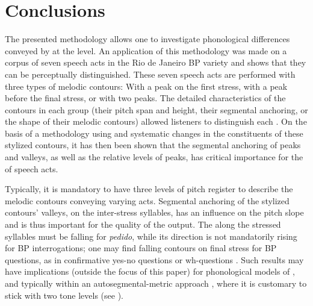 \documentclass[output=paper]{LSP/langsci}
\begin{document}
\section{Conclusions}
\label{conclusions}
The presented methodology allows one to investigate phonological differences conveyed by  at the  level. 
An application of this methodology was made on a corpus of seven  speech acts in the Rio de Janeiro BP variety and shows that they can be perceptually distinguished. 
These seven speech acts are performed with three types of melodic contours: With a peak on the first stress, with a peak before the final stress, or with two peaks. 
The detailed characteristics of the contours in each group (their pitch span and height, their segmental anchoring, or the shape of their melodic contours) allowed listeners to distinguish each . 
On the basis of a methodology using  and systematic changes in the constituents of these stylized contours, it has then been shown that the segmental anchoring of peaks and valleys, as well as the relative levels of peaks, has critical importance for the  of speech acts.
\largerpage[-1]

Typically, it is mandatory to have three levels of pitch register to describe the melodic contours conveying varying  acts. 
Segmental anchoring of the stylized contours' valleys, on the inter-stress syllables, has an influence on the pitch slope and is thus important for the quality of the output. 
The  along the stressed syllables must be falling for \textit{pedido}, while its direction is not mandatorily rising for BP interrogations; one may find falling contours on final stress for BP questions, as in confirmative yes-no questions or wh-questions \citep{moraes2008pitch}.
Such results may have implications (outside the focus of this paper) for phonological models of , and typically within an autosegmental-metric approach \citep{Ladd2008}, where it is customary to stick with two tone levels (see \citealt{FacePrieto.2007,dimperio2010alignment}). 

{\sloppy
\printbibliography[heading=subbibliography,notkeyword=this]}
\end{document}
